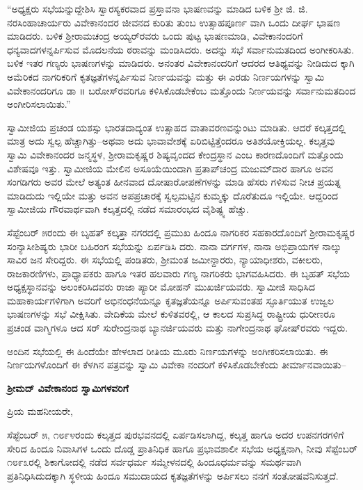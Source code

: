 “ಅಧ್ಯಕ್ಷರು ಸಭೆಯನ್ನುದ್ದೇಶಿಸಿ ಸ್ವಾರಸ್ಯಕರವಾದ ಪ್ರಸ್ತಾವನಾ ಭಾಷಣವನ್ನು ಮಾಡಿದ ಬಳಿಕ ಶ್ರೀ ಜಿ. ಜಿ. ನರಸಿಂಹಾಚಾರ್ಯರು ವಿವೇಕಾನಂದರ ಜೀವನದ ಕುರಿತು ತುಂಬ ಉತ್ಸಾಹಪೂರ್ಣ ವಾಗಿ ಒಂದು ದೀರ್ಘ ಭಾಷಣ ಮಾಡಿದರು. ಬಳಿಕ ಶ್ರೀರಾಮಚಂದ್ರ ಅಯ್ಯರ್​ರವರು ಒಂದು ಪುಟ್ಟ ಭಾಷಣಮಾಡಿ, ವಿವೇಕಾನಂದರಿಗೆ ಧನ್ಯವಾದಗಳನ್ನರ್ಪಿಸುವ ಮೊದಲನೆಯ ಠರಾವನ್ನು ಮಂಡಿಸಿದರು. ಅದನ್ನು ಸಭೆ ಸರ್ವಾನುಮತದಿಂದ ಅಂಗೀಕರಿಸಿತು. ಬಳಿಕ ಇತರ ಗಣ್ಯರು ಭಾಷಣಗಳನ್ನು ಮಾಡಿದರು. ಅನಂತರ ವಿವೇಕಾನಂದರಿಗೆ ಆದರದ ಆತಿಥ್ಯವನ್ನು ನೀಡಿದುದ ಕ್ಕಾಗಿ ಅಮೆರಿಕದ ನಾಗರಿಕರಿಗೆ ಕೃತಜ್ಞತೆಗಳನ್ನರ್ಪಿಸುವ ನಿರ್ಣಯವನ್ನು ಮತ್ತು ಈ ಎರಡು ನಿರ್ಣಯಗಳನ್ನು ಸ್ವಾಮಿ ವಿವೇಕಾನಂದರಿಗೂ ಡಾ ॥ ಬರೋಸ್​ರವರಿಗೂ ಕಳಿಸಿಕೊಡಬೇಕೆಂಬ ಮತ್ತೊಂದು ನಿರ್ಣಯವನ್ನು ಸರ್ವಾನುಮತದಿಂದ ಅಂಗೀರಿಸಲಾಯಿತು.”

ಸ್ವಾಮೀಜಿಯ ಪ್ರಚಂಡ ಯಶಸ್ಸು ಭಾರತದಾದ್ಯಂತ ಉತ್ಸಾಹದ ವಾತಾವರಣವನ್ನುಂಟು ಮಾಡಿತು. ಆದರೆ ಕಲ್ಕತ್ತದಲ್ಲಿ ಮಾತ್ರ ಅದು ಸ್ವಲ್ಪ ಹೆಚ್ಚಾಗಿತ್ತು–ಅಥವಾ ಅದು ಭಾವಾವೇಶಕ್ಕೆ ಏರಿಬಿಟ್ಟಿತ್ತೆಂದರೂ ಅತಿಶಯೋಕ್ತಿಯಲ್ಲ. ಕಲ್ಕತ್ತವು ಸ್ವಾಮಿ ವಿವೇಕಾನಂದರ ಜನ್ಮಸ್ಥಳ, ಶ್ರೀರಾಮಕೃಷ್ಣರ ಶಿಷ್ಯವೃಂದದ ಕೇಂದ್ರಸ್ಥಾನ ಎಂಬ ಕಾರಣದೊಂದಿಗೆ ಮತ್ತೊಂದು ವಿಶೇಷವೂ ಇತ್ತು. ಸ್ವಾಮೀಜಿಯ ಮೇಲಿನ ಅಸೂಯೆಯಿಂದಾಗಿ ಪ್ರತಾಪ್​ಚಂದ್ರ ಮಜುಮ್​ದಾರ ಹಾಗೂ ಅವನ ಸಂಗಡಿಗರು ಅವರ ಮೇಲೆ ಅತ್ಯಂತ ಹೀನವಾದ ದೋಷಾರೋಪಣೆಗಳನ್ನು ಮಾಡಿ ಹೆಸರು ಗಳಿಸುವ ನೀಚ ಪ್ರಯತ್ನ ಮಾಡಿದುದು ಇಲ್ಲಿಯೇ ಮತ್ತು ಅವನ ಅಪಪ್ರಚಾರಕ್ಕೆ ಸ್ವಲ್ಪಮಟ್ಟಿನ ಕುಮ್ಮಕ್ಕು ದೊರೆತುದೂ ಇಲ್ಲಿಯೇ. ಆದ್ದರಿಂದ ಸ್ವಾಮೀಜಿಯ ಗೌರವಾರ್ಥವಾಗಿ ಕಲ್ಕತ್ತದಲ್ಲಿ ನಡೆದ ಸಮಾರಂಭದ ವೈಶಿಷ್ಟ್ಯ ಹೆಚ್ಚು.

ಸೆಪ್ಟೆಂಬರ್ ೫ರಂದು ಈ ಬೃಹತ್ ಕಲ್ಕತ್ತಾ ನಗರದಲ್ಲಿ ಪ್ರಮುಖ ಹಿಂದೂ ನಾಗರಿಕರ ಸಹಕಾರದೊಂದಿಗೆ ಶ್ರೀರಾಮಕೃಷ್ಣರ ಸಂನ್ಯಾಸೀಶಿಷ್ಯರು ಭಾರೀ ಬಹಿರಂಗ ಸಭೆಯನ್ನು ಏರ್ಪಡಿಸಿ ದರು. ನಾನಾ ವರ್ಗಗಳ, ನಾನಾ ಅಭಿಪ್ರಾಯಗಳ ನಾಲ್ಕು ಸಾವಿರ ಜನ ಸೇರಿದ್ದರು. ಈ ಸಭೆಯಲ್ಲಿ ಪಂಡಿತರು, ಶ್ರೀಮಂತ ಜಮೀನ್ದಾರರು, ನ್ಯಾಯಾಧೀಶರು, ವಕೀಲರು, ರಾಜಕಾರಣಿಗಳು, ಪ್ರಾಧ್ಯಾಪಕರು ಹಾಗೂ ಇತರ ಹಲವಾರು ಗಣ್ಯ ನಾಗರಿಕರು ಭಾಗವಹಿಸಿದರು. ಈ ಬೃಹತ್ ಸಭೆಯ ಅಧ್ಯಕ್ಷಸ್ಥಾನವನ್ನು ಅಲಂಕರಿಸಿದವರು ರಾಜಾ ಪ್ಯಾರೀ ಮೋಹನ್ ಮುಖರ್ಜಿಯವರು. ಸ್ವಾಮೀಜಿ ಸಾಧಿಸಿದ ಮಹಾಕಾರ್ಯಗಳಿಗಾಗಿ ಅವರಿಗೆ ಅಭಿನಂಧನೆಯನ್ನೂ ಕೃತಜ್ಞತೆಯನ್ನೂ ಅರ್ಪಿಸುವಂತಹ ಸ್ಫೂರ್ತಿಯುತ ಉಜ್ವಲ ಭಾಷಣಗಳನ್ನು ಸಭೆ ವೀಕ್ಷಿಸಿತು. ವೇದಿಕೆಯ ಮೇಲೆ ಕುಳಿತವರಲ್ಲಿ, ಆ ಕಾಲದ ಸುಪ್ರಸಿದ್ಧ ರಾಷ್ಟ್ರೀಯ ಧುರೀಣರೂ ಪ್ರಚಂಡ ವಾಗ್ಮಿಗಳೂ ಆದ ಸರ್ ಸುರೇಂದ್ರನಾಥ ಬ್ಯಾನರ್ಜಿಯವರು ಮತ್ತು ನಾಗೇಂದ್ರನಾಥ ಘೋಷ್​ರವರು ಇದ್ದರು.

ಅಂದಿನ ಸಭೆಯಲ್ಲಿ ಈ ಹಿಂದೆಯೇ ಹೇಳಲಾದ ರೀತಿಯ ಮೂರು ನಿರ್ಣಯಗಳನ್ನು ಅಂಗೀಕರಿಸಲಾಯಿತು. ಈ ನಿರ್ಣಯಗಳೊಂದಿಗೆ ಈ ಕೆಳಗಿನ ಪತ್ರವನ್ನು ಸ್ವಾಮಿ ವಿವೇಕಾ ನಂದರಿಗೆ ಕಳಿಸಿಕೊಡಬೇಕೆಂದು ತೀರ್ಮಾನವಾಯಿತು–

\textbf{ಶ್ರೀಮದ್ ವಿವೇಕಾನಂದ ಸ್ವಾಮಿಗಳವರಿಗೆ}

ಪ್ರಿಯ ಮಹನೀಯರೇ,

ಸೆಪ್ಟೆಂಬರ್ ೫, ೧೮೯೪ರಂದು ಕಲ್ಕತ್ತದ ಪುರಭವನದಲ್ಲಿ ಏರ್ಪಡಿಸಲಾಗಿದ್ದ, ಕಲ್ಕತ್ತ ಹಾಗೂ ಅದರ ಉಪನಗರಗಳಿಗೆ ಸೇರಿದ ಹಿಂದೂ ನಿವಾಸಿಗಳ ಒಂದು ದೊಡ್ಡ ಪ್ರಾತಿನಿಧಿಕ ಹಾಗೂ ಪ್ರಭಾವಶಾಲೀ ಸಭೆಯ ಅಧ್ಯಕ್ಷನಾಗಿ, ನೀವು ಸೆಪ್ಟೆಂಬರ್ ೧೮೯೩ರಲ್ಲಿ ಶಿಕಾಗೋದಲ್ಲಿ ನಡೆದ ಸರ್ವಧರ್ಮ ಸಮ್ಮೇಳನದಲ್ಲಿ ಹಿಂದೂಧರ್ಮವನ್ನು ಸಮರ್ಥವಾಗಿ ಪ್ರತಿನಿಧಿಸಿದುದಕ್ಕಾಗಿ ಸ್ಥಳೀಯ ಹಿಂದೂ ಸಮುದಾಯದ ಕೃತಜ್ಞತೆಗಳನ್ನು ಅರ್ಪಿಸಲು ನನಗೆ ಸಂತೋಷವೆನಿಸುತ್ತದೆ.

